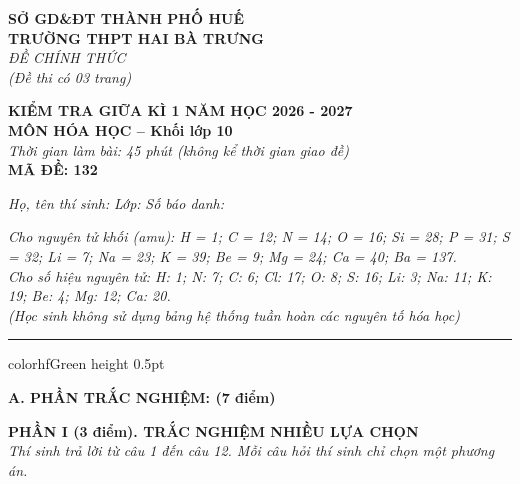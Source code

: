 \documentclass[11pt,a4paper]{article}
\begin{document}
\begin{minipage}[t]{0.48\textwidth}
\textbf{SỞ GD\&ĐT THÀNH PHỐ HUẾ}\\
\textbf{TRƯỜNG THPT HAI BÀ TRƯNG}\\
\textit{ĐỀ CHÍNH THỨC}\\
\textit{(Đề thi có 03 trang)}
\end{minipage}
\hfill
\begin{minipage}[t]{0.48\textwidth}
\raggedleft
\textbf{\color{hfRed}KIỂM TRA GIỮA KÌ 1 NĂM HỌC 2026 - 2027}\\
\textbf{MÔN HÓA HỌC -- Khối lớp 10}\\
\textit{Thời gian làm bài: 45 phút (không kể thời gian giao đề)}\\
\textbf{MÃ ĐỀ: 132}
\end{minipage}

\vspace{4pt}
\noindent
\textit{Họ, tên thí sinh:} \dotfill \textit{Lớp:} \dotfill \textit{Số báo danh:} \dotfill

\vspace{3pt}
\noindent
\textit{\footnotesize Cho nguyên tử khối (amu): H = 1; C = 12; N = 14; O = 16; Si = 28; P = 31; S = 32; Li = 7; Na = 23; K = 39; Be = 9; Mg = 24; Ca = 40; Ba = 137.\\
Cho số hiệu nguyên tử: H: 1; N: 7; C: 6; Cl: 17; O: 8; S: 16; Li: 3; Na: 11; K: 19; Be: 4; Mg: 12; Ca: 20.\\
(Học sinh không sử dụng bảng hệ thống tuần hoàn các nguyên tố hóa học)}

\vspace{3pt}
\hrule color{hfGreen} height 0.5pt

\vspace{4pt}
\noindent
{\color{mainGreen}\textbf{\Large A. PHẦN TRẮC NGHIỆM: (7 điểm)}}

\vspace{3pt}
\noindent
{\color{mainGreen}\textbf{\large PHẦN I (3 điểm). TRẮC NGHIỆM NHIỀU LỰA CHỌN}}\\
\textit{\small Thí sinh trả lời từ câu 1 đến câu 12. Mỗi câu hỏi thí sinh chỉ chọn một phương án.}
\vspace{2pt}
\end{document}
